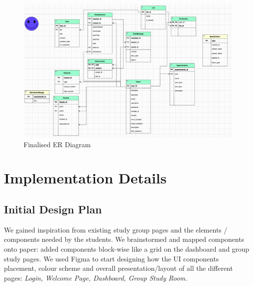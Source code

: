 \begin{figure}
    \centering
    \includegraphics[width=1\linewidth]{ER-diagram.png}
    \caption{Finalised ER Diagram}
    \label{fig:er-diagram}
\end{figure}


\section{Implementation Details}
\label{sect:implementation-details}
\subsection{Initial Design Plan}
We gained inspiration from existing study group pages and the elements / components needed by the students. We brainstormed and mapped components onto paper: added components block-wise like a grid on the dashboard and group study pages. We used Figma to start designing how the UI components placement, colour scheme and overall presentation/layout of all the different pages: \textit{Login, Welcome Page, Dashboard, Group Study Room.}

